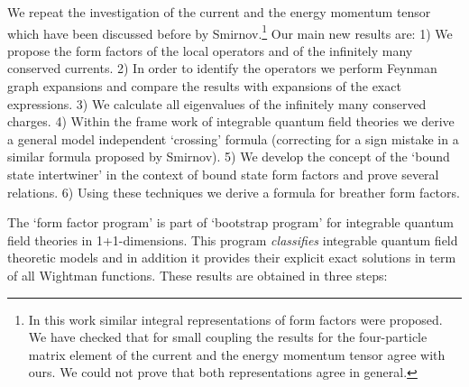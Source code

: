 \documentclass[a4paper,a4paper]{article}
\begin{document}
We repeat the investigation of the current and the energy momentum tensor
which have been discussed before by Smirnov\cite{Sm}.\footnote{%
In this work similar integral representations of form factors were proposed.
We have checked that for small coupling the results for the four-particle
matrix element of the current and the energy momentum tensor agree with
ours. We could not prove that both representations agree in general.} Our
main new results are: 1) We propose the form factors of the local operators \coordHE{} and of the
infinitely many conserved currents. 2) In order to identify the operators we
perform Feynman graph expansions and compare the results with expansions of
the exact expressions. 3) We calculate all eigenvalues of the infinitely
many conserved charges. 4) Within the frame work of integrable quantum field
theories we derive a general model independent `crossing' formula
(correcting for a sign mistake in a similar formula proposed by Smirnov\cite
{Sm}). 5) We develop the concept of the `bound state intertwiner' in the
context of bound state form factors and prove several relations. 6) Using
these techniques we derive a formula for breather form factors.

The `form factor program' is part of `bootstrap program' for integrable
quantum field theories in 1+1-dimensions. This program \emph{classifies}
integrable quantum field theoretic models and in addition it provides their
explicit exact solutions in term of all Wightman functions. These results
are obtained in three steps:
\end{document}
